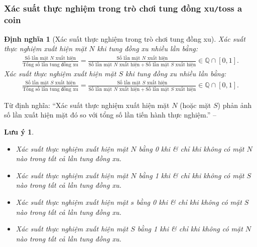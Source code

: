 \documentclass{article}
\numberwithin{equation}{section}
\newtheorem{definition}{Định nghĩa}[section]
\newtheorem{remark}{Lưu ý}[section]
\begin{document}
\subsubsection{Xác suất thực nghiệm trong trò chơi tung đồng xu\texttt{/}toss a coin}
\begin{definition}[Xác suất thực nghiệm trong trò chơi tung đồng xu]
	\emph{Xác suất thực nghiệm xuất hiện mặt $N$} khi tung đồng xu nhiều lần bằng:
	\begin{align*}
		\frac{\mbox{Số lần mặt $N$ xuất hiện}}{\mbox{Tổng số lần tung đồng xu}} = \frac{\mbox{Số lần mặt $N$ xuất hiện}}{\mbox{Số lần mặt $N$ xuất hiện} + \mbox{Số lần mặt $S$ xuất hiện}}\in\mathbb{Q}\cap[0,1].
	\end{align*}
	\emph{Xác suất thực nghiệm xuất hiện mặt $S$} khi tung đồng xu nhiều lần bằng:
	\begin{align*}
		\frac{\mbox{Số lần mặt $S$ xuất hiện}}{\mbox{Tổng số lần tung đồng xu}} = \frac{\mbox{Số lần mặt $S$ xuất hiện}}{\mbox{Số lần mặt $N$ xuất hiện} + \mbox{Số lần mặt $S$ xuất hiện}}\in\mathbb{Q}\cap[0,1].
	\end{align*}
\end{definition}
Từ định nghĩa: ``Xác suất thực nghiệm xuất hiện mặt $N$ (hoặc mặt $S$) phản ảnh số lần xuất hiện mặt đó so với tổng số lần tiến hành thực nghiệm.'' -- \cite[p. 18]{Thai_Anh_Dat_Ha_Loan_Nam_Quang_Toan_6_tap_2}

\begin{remark}
	\begin{itemize}
		\item Xác suất thực nghiệm xuất hiện mặt $N$ bằng 0 khi \textit{\&} chỉ khi không có mặt $N$ nào trong tất cả lần tung đồng xu.
		\item Xác suất thực nghiệm xuất hiện mặt $N$ bằng 1 khi \textit{\&} chỉ khi không có mặt $S$ nào trong tất cả lần tung đồng xu.
		\item Xác suất thực nghiệm xuất hiện mặt $s$ bằng 0 khi \textit{\&} chỉ khi không có mặt $S$ nào trong tất cả lần tung đồng xu.
		\item Xác suất thực nghiệm xuất hiện mặt $S$ bằng 1 khi \textit{\&} chỉ khi không có mặt $N$ nào trong tất cả lần tung đồng xu.
	\end{itemize}
\end{remark}
\end{document}
